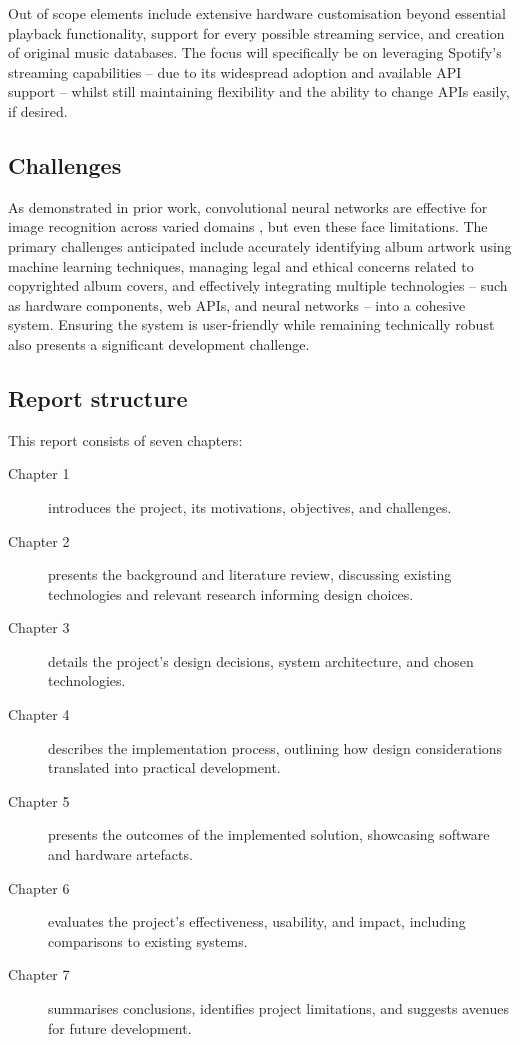             Out of scope elements include extensive hardware customisation beyond essential playback functionality, support for every possible streaming service, and creation of original music databases. The focus will specifically be on leveraging Spotify's streaming capabilities -- due to its widespread adoption and available API support -- whilst still maintaining flexibility and the ability to change APIs easily, if desired.
        
        \subsection{Challenges}
    
            As demonstrated in prior work, convolutional neural networks are effective for image recognition across varied domains \cite{cnnsforimagerecognition, imagenetclasscnn}, but even these face limitations. The primary challenges anticipated include accurately identifying album artwork using machine learning techniques, managing legal and ethical concerns related to copyrighted album covers, and effectively integrating multiple technologies -- such as hardware components, web APIs, and neural networks -- into a cohesive system. Ensuring the system is user-friendly while remaining technically robust also presents a significant development challenge.
        
        \subsection{Report structure} %
        
            This report consists of seven chapters:
            \begin{description}
                \item[Chapter 1] introduces the project, its motivations, objectives, and challenges.
                \item[Chapter 2] presents the background and literature review, discussing existing technologies and relevant research informing design choices.
                \item[Chapter 3] details the project's design decisions, system architecture, and chosen technologies.
                \item[Chapter 4] describes the implementation process, outlining how design considerations translated into practical development.
                \item[Chapter 5] presents the outcomes of the implemented solution, showcasing software and hardware artefacts.
                \item[Chapter 6] evaluates the project's effectiveness, usability, and impact, including comparisons to existing systems.
                \item[Chapter 7] summarises conclusions, identifies project limitations, and suggests avenues for future development.
            \end{description}
    

